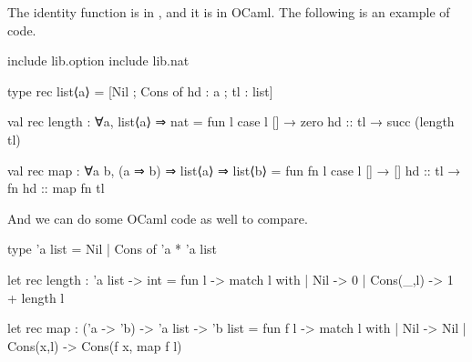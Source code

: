 The identity function is  in \pml, and it is  in OCaml. The following is an example of \pml code.
\begin{pmlcode}
include lib.option
include lib.nat

type rec list⟨a⟩ = [Nil ; Cons of {hd : a ; tl : list}]

val rec length : ∀a, list⟨a⟩ ⇒ nat =
  fun l {
    case l {
      []       → zero
      hd :: tl → succ (length tl)
    }
  }

val rec map : ∀a b, (a ⇒ b) ⇒ list⟨a⟩ ⇒ list⟨b⟩ =
  fun fn l {
    case l {
      []       → []
      hd :: tl → fn hd :: map fn tl
    }
  }
\end{pmlcode}

And we can do some OCaml code as well to compare.
\begin{camlcode}
type 'a list = Nil | Cons of 'a * 'a list

let rec length : 'a list -> int = fun l ->
  match l with
  | Nil       -> 0
  | Cons(_,l) -> 1 + length l

let rec map : ('a -> 'b) -> 'a list -> 'b list = fun f l ->
  match l with
  | Nil       -> Nil
  | Cons(x,l) -> Cons(f x, map f l)
\end{camlcode}



